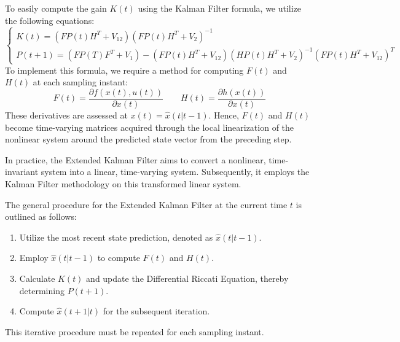 To easily compute the gain $K(t)$ using the Kalman Filter formula, we utilize the following equations:
\[\begin{cases}
    K(t)=\left(FP(t)H^T+V_{12}\right)\left(FP(t)H^T+V_2\right)^{-1} \\
    P(t+1)=\left(FP(T)F^T+V_1\right)-\left(FP(t)H^T+V_{12}\right)\left(HP(t)H^T+V_{2}\right)^{-1}\left(FP(t)H^T+V_{12}\right)^T
\end{cases}\]
To implement this formula, we require a method for computing $F(t)$ and $H(t)$ at each sampling instant:
\[F(t)=\dfrac{\partial f(x(t),u(t))}{\partial x(t)} \qquad H(t)=\dfrac{\partial h(x(t))}{\partial x(t)}\]
These derivatives are assessed at $x(t)=\hat{x}(t|t-1)$. 
Hence, $F(t)$ and $H(t)$ become time-varying matrices acquired through the local linearization of the nonlinear system around the predicted state vector from the preceding step.

In practice, the Extended Kalman Filter aims to convert a nonlinear, time-invariant system into a linear, time-varying system. 
Subsequently, it employs the Kalman Filter methodology on this transformed linear system.

The general procedure for the Extended Kalman Filter at the current time $t$ is outlined as follows:
\begin{enumerate}
    \item Utilize the most recent state prediction, denoted as $\hat{x}(t|t-1)$. 
    \item Employ $\hat{x}(t|t-1)$ to compute $F(t)$ and $H(t)$. 
    \item Calculate $K(t)$  and update the Differential Riccati Equation, thereby determining $P(t+1)$. 
    \item Compute $\hat{x}(t+1|t)$ for the subsequent iteration.
\end{enumerate}
This iterative procedure must be repeated for each sampling instant. 


